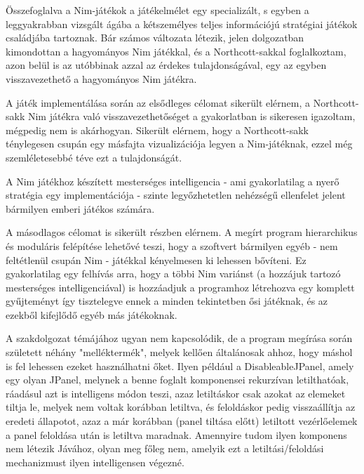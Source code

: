 \label{Chap:osszefoglalas}

Összefoglalva a Nim-játékok a játékelmélet egy specializált, s egyben a leggyakrabban vizsgált ágába a kétszemélyes teljes információjú stratégiai játékok családjába tartoznak. Bár számos változata létezik, jelen dolgozatban kimondottan a hagyományos Nim játékkal, és a Northcott-sakkal foglalkoztam, azon belül is az utóbbinak azzal az érdekes tulajdonságával, egy az egyben visszavezethető a hagyományos Nim játékra.\ujsor

A játék implementálása során az elsődleges célomat sikerült elérnem, a Northcott-sakk Nim játékra való visszavezethetőséget a gyakorlatban is sikeresen igazoltam, mégpedig nem is akárhogyan. Sikerült elérnem, hogy a Northcott-sakk ténylegesen csupán egy másfajta vizualizációja legyen a Nim-játéknak, ezzel még szemléletesebbé téve ezt a tulajdonságát.\ujsor

A Nim játékhoz készített mesterséges intelligencia - ami gyakorlatilag a nyerő stratégia egy implementációja - szinte legyőzhetetlen nehézségű ellenfelet jelent bármilyen emberi játékos számára.\ujsor

A másodlagos célomat is sikerült részben elérnem. A megírt program hierarchikus és moduláris felépítése lehetővé teszi, hogy a szoftvert bármilyen egyéb - nem feltétlenül csupán Nim - játékkal kényelmesen ki lehessen bővíteni. Ez gyakorlatilag egy felhívás arra, hogy a többi Nim variánst (a hozzájuk tartozó mesterséges intelligenciával) is hozzáadjuk a programhoz létrehozva egy komplett gyűjteményt így tisztelegve ennek a minden tekintetben ősi játéknak, és az ezekből kifejlődő egyéb más játékoknak.\ujsor

A szakdolgozat témájához ugyan nem kapcsolódik, de a program megírása során született néhány "melléktermék", melyek kellően általánosak ahhoz, hogy máshol is fel lehessen ezeket használhatni őket. Ilyen például a DisableableJPanel, amely egy olyan JPanel, melynek a benne foglalt komponensei rekurzívan letilthatóak, ráadásul azt is intelligens módon teszi, azaz letiltáskor csak azokat az elemeket tiltja le, melyek nem voltak korábban letiltva, és feloldáskor pedig visszaállítja az eredeti állapotot, azaz a már korábban (panel tiltása előtt) letiltott vezérlőelemek a panel feloldása után is letiltva maradnak. Amennyire tudom ilyen komponens nem létezik Jávához, olyan meg főleg nem, amelyik ezt a letiltási/feloldási mechanizmust ilyen intelligensen végezné.

